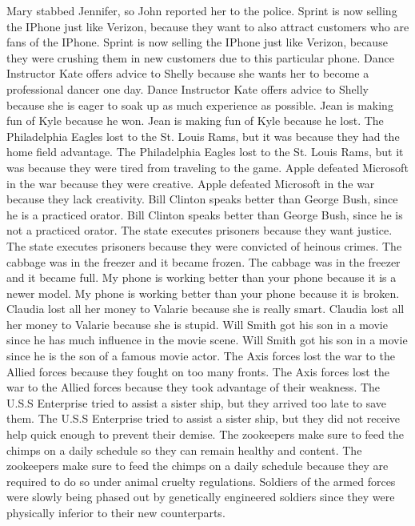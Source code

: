 \documentclass{article}
\begin{document}
\begin{enumerate}
	Mary stabbed Jennifer, so John reported her to the police.
	Sprint is now selling the IPhone just like Verizon, because they want to also attract customers who are fans of the IPhone.
	Sprint is now selling the IPhone just like Verizon, because they were crushing them in new customers due to this particular phone.
	Dance Instructor Kate offers advice to Shelly because she wants her to become a professional dancer one day.
	Dance Instructor Kate offers advice to Shelly because she is eager to soak up as much experience as possible.
	Jean is making fun of Kyle because he won.
	Jean is making fun of Kyle because he lost.
	The Philadelphia Eagles lost to the St. Louis Rams, but it was because they had the home field advantage.
	The Philadelphia Eagles lost to the St. Louis Rams, but it was because they were tired from traveling to the game.
	Apple defeated Microsoft in the war because they were creative.
	Apple defeated Microsoft in the war because they lack creativity.
	Bill Clinton speaks better than George Bush, since he is a practiced orator.
	Bill Clinton speaks better than George Bush, since he is not a practiced orator.
	The state executes prisoners because they want justice.
	The state executes prisoners because they were convicted of heinous crimes.
	The cabbage was in the freezer and it became frozen.
	The cabbage was in the freezer and it became full.
	My phone is working better than your phone because it is a newer model.
	My phone is working better than your phone because it is broken.
	Claudia lost all her money to Valarie because she is really smart.
	Claudia lost all her money to Valarie because she is stupid.
	Will Smith got his son in a movie since he has much influence in the movie scene.
	Will Smith got his son in a movie since he is the son of a famous movie actor.
	The Axis forces lost the war to the Allied forces because they fought on too many fronts.
	The Axis forces lost the war to the Allied forces because they took advantage of their weakness.
	The U.S.S Enterprise tried to assist a sister ship, but they arrived too late to save them.
	The U.S.S Enterprise tried to assist a sister ship, but they did not receive help quick enough to prevent their demise.
	The zookeepers make sure to feed the chimps on a daily schedule so they can remain healthy and content.
	The zookeepers make sure to feed the chimps on a daily schedule because they are required to do so under animal cruelty regulations.
	Soldiers of the armed forces were slowly being phased out by genetically engineered soldiers since they were physically inferior to their new counterparts.

\end{enumerate}
\end{document}
